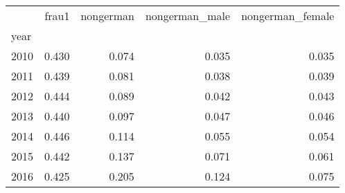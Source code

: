 \begin{tabular}{lrrrr}
\toprule
{} &  frau1 &  nongerman &  nongerman\_male &  nongerman\_female \\
year &        &            &                 &                   \\
\midrule
2010 &  0.430 &      0.074 &           0.035 &             0.035 \\
2011 &  0.439 &      0.081 &           0.038 &             0.039 \\
2012 &  0.444 &      0.089 &           0.042 &             0.043 \\
2013 &  0.440 &      0.097 &           0.047 &             0.046 \\
2014 &  0.446 &      0.114 &           0.055 &             0.054 \\
2015 &  0.442 &      0.137 &           0.071 &             0.061 \\
2016 &  0.425 &      0.205 &           0.124 &             0.075 \\
\bottomrule
\end{tabular}
